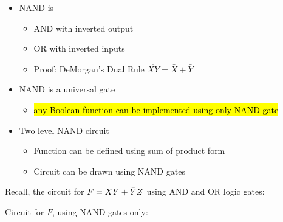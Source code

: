 \begin{frame}[fragile]
    \begin{itemize}
        \item NAND is
        \begin{itemize}
        \item AND with inverted output
        \item OR with inverted inputs
        \item Proof: DeMorgan's Dual Rule $\overline{XY}=\bar{X}+\bar{Y}$
    \end{itemize}
     \resizebox{5cm}{3cm}{
    
    }
    \item NAND is a universal gate
    \begin{itemize}
        \item \hl{any Boolean function can be implemented using only NAND gate}
    \end{itemize}
    \item Two level NAND circuit
    \begin{itemize}
        \item Function can be defined using sum of product form
        \item Circuit can be drawn using NAND gates
    \end{itemize}
    
    \end{itemize}
   
\end{frame}

\begin{frame}[fragile]
    Recall, the circuit for $F = XY + \Bar{Y}Z$ using AND and OR logic gates:

{\color{red}Circuit for $F$, using NAND gates only:}
\bigskip


\end{frame}


